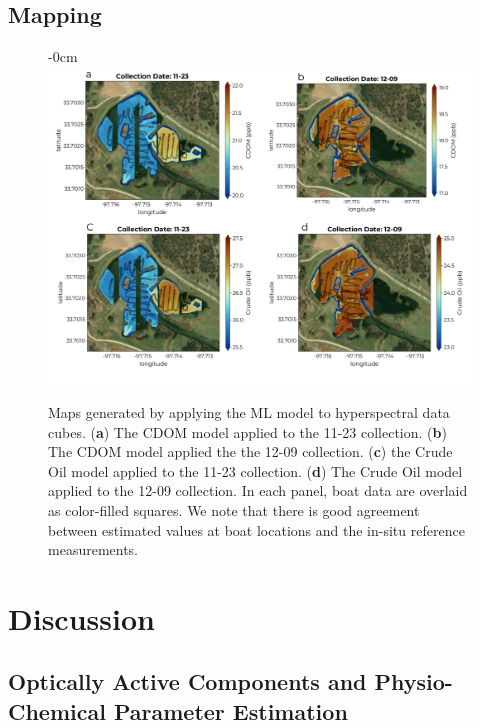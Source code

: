 \documentclass[journal,article,submit,pdftex,moreauthors]{Definitions/mdpi}
\begin{document}
\subsection{Mapping}

\begin{figure}[H]
\begin{adjustwidth}{-\extralength}{0cm}
\centering
\includegraphics[width=18.0cm]{paper/figures/results/map-combined.pdf}
\end{adjustwidth}
\caption{Maps generated by applying the ML model to hyperspectral data cubes. (\textbf{a}) The CDOM model applied to the 11-23 collection. (\textbf{b}) The CDOM model applied the the 12-09 collection. (\textbf{c}) the Crude Oil model applied to the 11-23 collection. (\textbf{d}) The Crude Oil model applied to the 12-09 collection. In each panel, boat data are overlaid as color-filled squares. We note that there is good agreement between estimated values at boat locations and the in-situ reference measurements. \label{fig:maps}}
\end{figure}  


\section{Discussion} \label{sec:discussion}


\subsection{Optically Active Components and Physio-Chemical Parameter Estimation}
\end{document}
